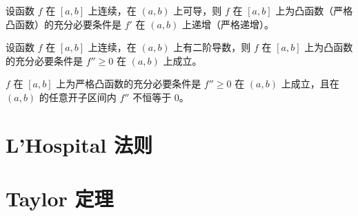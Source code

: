 \begin{theorem}
  设函数 $f$ 在 $[a,b]$ 上连续，在 $(a,b)$ 上可导，则 $f$ 在 $[a,b]$ 上为凸函数（严格凸函数）的充分必要条件是 $f'$ 在 $(a,b)$ 上递增（严格递增）。
\end{theorem}

\begin{theorem}
  设函数 $f$ 在 $[a,b]$ 上连续，在 $(a,b)$ 上有二阶导数，则 $f$ 在 $[a,b]$ 上为凸函数的充分必要条件是 $f'' \geqslant 0$ 在 $(a,b)$ 上成立。

  $f$ 在 $[a,b]$ 上为严格凸函数的充分必要条件是 $f'' \geqslant 0$ 在 $(a,b)$ 上成立，且在 $(a,b)$ 的任意开子区间内 $f''$ 不恒等于 $0$。
\end{theorem}

\section{L'Hospital 法则}







\section{Taylor 定理}






